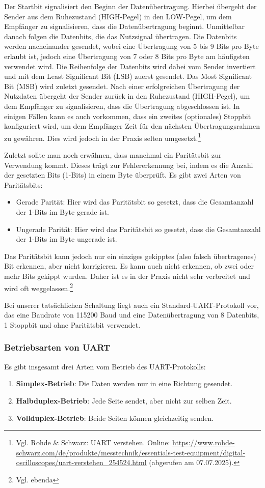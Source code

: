 Der Startbit signalisiert den Beginn der Datenübertragung. Hierbei übergeht der Sender aus dem Ruhezustand (HIGH-Pegel) in den LOW-Pegel, um dem Empfänger zu signalisieren, dass die Datenübertragung beginnt. 
Unmittelbar danach folgen die Datenbits, die das Nutzsignal übertragen. Die Datenbits werden nacheinander gesendet, wobei eine Übertragung von 5 bis 9 Bits pro Byte erlaubt ist, jedoch eine Übertragung von 7 oder 8 Bits pro Byte am häufigsten verwendet wird. Die Reihenfolge der Datenbits wird dabei vom Sender invertiert und mit dem Least Significant Bit (LSB) zuerst gesendet. Das Most Significant Bit (MSB) wird zuletzt gesendet.
Nach einer erfolgreichen Übertragung der Nutzdaten übergeht der Sender zurück in den Ruhezustand (HIGH-Pegel), um dem Empfänger zu signalisieren, dass die Übertragung abgeschlossen ist.
In einigen Fällen kann es auch vorkommen, dass ein zweites (optionales) Stoppbit konfiguriert wird, um dem Empfänger Zeit für den nächsten Übertragungsrahmen zu gewähren. Dies wird jedoch in der Praxis selten umgesetzt.\footnote{Vgl. Rohde \& Schwarz: UART verstehen. Online: \url{https://www.rohde-schwarz.com/de/produkte/messtechnik/essentials-test-equipment/digital-oscilloscopes/uart-verstehen_254524.html} (abgerufen am 07.07.2025).}

Zuletzt sollte man noch erwähnen, dass manchmal ein Paritätsbit zur Verwendung kommt. Dieses trägt zur Fehlererkennung bei, indem es die Anzahl der gesetzten Bits (1-Bits) in einem Byte überprüft. Es gibt zwei Arten von Paritätsbits: 
\begin{itemize}
    \item Gerade Parität: Hier wird das Paritätsbit so gesetzt, dass die Gesamtanzahl der 1-Bits im Byte gerade ist.
    \item Ungerade Parität: Hier wird das Paritätsbit so gesetzt, dass die Gesamtanzahl der 1-Bits im Byte ungerade ist.
\end{itemize}

Das Paritätsbit kann jedoch nur ein einziges gekipptes (also falsch übertragenes) Bit erkennen, aber nicht korrigieren. Es kann auch nicht erkennen, ob zwei oder mehr Bits gekippt wurden. Daher ist es in der Praxis nicht sehr verbreitet und wird oft weggelassen.\footnote{Vgl. ebenda}

Bei unserer tatsächlichen Schaltung liegt auch ein Standard-UART-Protokoll vor, das eine Baudrate von 115200 Baud und eine Datenübertragung von 8 Datenbits, 1 Stoppbit und ohne Paritätsbit verwendet.

\subsubsection{Betriebsarten von UART}
Es gibt insgesamt drei Arten vom Betrieb des UART-Protokolls:
\begin{enumerate}
    \item \textbf{Simplex-Betrieb}: Die Daten werden nur in eine Richtung gesendet.
    \item \textbf{Halbduplex-Betrieb}: Jede Seite sendet, aber nicht zur selben Zeit.
    \item \textbf{Vollduplex-Betrieb}: Beide Seiten können gleichzeitig senden.
\end{enumerate}

